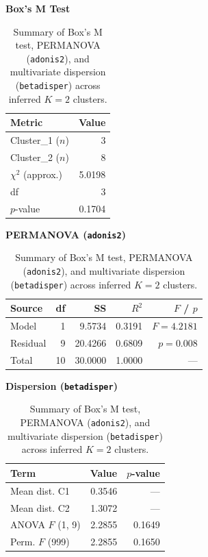 \documentclass[12pt, a4paper]{article}
\begin{document}
\begin{table}[htbp!]
    \centering
    \caption{Summary of Box's M test, PERMANOVA (\texttt{adonis2}), and multivariate dispersion (\texttt{betadisper}) across inferred $K = 2$ clusters.}
    \label{tab:three_narrow_row}
    \scriptsize
    \setlength{\tabcolsep}{4pt}

    \begin{minipage}[t]{0.29\textwidth}
        \centering
        \textbf{Box's M Test}\\[0.2em]
        \begin{tabular}{lr}
            \toprule
            Metric & Value \\
            \midrule
            Cluster\_1 ($n$) & 3 \\
            Cluster\_2 ($n$) & 8 \\
            $\chi^2$ (approx.) & 5.0198 \\
            df & 3 \\
            $p$-value & 0.1704 \\
            \bottomrule
        \end{tabular}
    \end{minipage}\hfill
    \begin{minipage}[t]{0.35\textwidth}
        \centering
        \textbf{PERMANOVA (\texttt{adonis2})}\\[0.2em]
        \begin{tabular}{lrrrr}
            \toprule
            Source & df & SS & $R^2$ & $F$ / $p$ \\
            \midrule
            Model    &  1 &  9.5734 & 0.3191 & $F=4.2181$ \\
            Residual &  9 & 20.4266 & 0.6809 & $p=0.008$ \\
            Total    & 10 & 30.0000 & 1.0000 & --- \\
            \bottomrule
        \end{tabular}
    \end{minipage}\hfill
    \begin{minipage}[t]{0.33\textwidth}
        \centering
        \textbf{Dispersion (\texttt{betadisper})}\\[0.2em]
        \begin{tabular}{lrr}
            \toprule
            Term & Value & $p$-value \\
            \midrule
            Mean dist. C1 & 0.3546 & --- \\
            Mean dist. C2 & 1.3072 & --- \\
            ANOVA $F$ (1, 9) & 2.2855 & 0.1649 \\
            Perm. $F$ (999) & 2.2855 & 0.1650 \\
            \bottomrule
        \end{tabular}
    \end{minipage}
\end{table}
\end{document}
